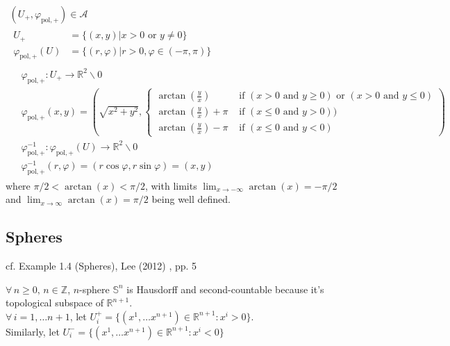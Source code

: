 \documentclass[10pt]{amsart}
\begin{document}
\begin{multicols*}{2}
\begin{equation} \label{Eq:UR22}
	\begin{gathered}
		(U_+, \varphi_{\text{pol},+}) \in \mathcal{A} \\ 
		\begin{aligned}
			U_+ & = \lbrace (x,y) | x>0 \text{ or } y \neq 0 \rbrace  \\
			\varphi_{\text{pol}, +}(U) & = \lbrace (r,\varphi) | r >0, \varphi \in (-\pi,\pi) \rbrace
		\end{aligned} \\
	 \begin{aligned}
			& \varphi_{\text{pol},+}:U_+ \to \mathbb{R}^2 \backslash 0 \\ 
			& \varphi_{\text{pol},+}(x,y) = ( \sqrt{x^2 + y^2}, \begin{cases} \arctan{ \left( \frac{y}{x} \right) }  & \text{ if } (x > 0 \text{ and } y \geq 0 ) \text{ or } (x > 0 \text{ and } y \leq 0) \\ \arctan{ \left( \frac{y}{x} \right) } + \pi & \text{ if } ( x \leq 0 \text{ and } y > 0)) \\
			\arctan{ \left( \frac{y}{x} \right) } - \pi & \text{ if } (x\leq 0 \text{ and } y < 0) \end{cases} ) \\ 
			& \varphi^{-1}_{\text{pol},+}: \varphi_{\text{pol},+}(U) \to \mathbb{R}^2\backslash 0 \\ 
			& \varphi^{-1}_{\text{pol},+}(r,\varphi) = (r\cos{\varphi}, r\sin{\varphi}) = (x,y)
		\end{aligned}
	\end{gathered}
\end{equation}
where $\pi/ 2 < \arctan(x) < \pi/ 2$, with limits $\lim_{x \to -\infty} \arctan(x) = -\pi/2$ and $\lim_{x \to \infty} \arctan(x) = \pi/2$ being well defined.



\subsection{Spheres}

cf. Example 1.4 (Spheres), Lee (2012) \cite{JLee2012}, pp. 5

$\forall \, n \geq 0, \, n \in \mathbb{Z}$, $n$-sphere $\mathbb{S}^n$ is Hausdorff and second-countable because it's topological subspace of $\mathbb{R}^{n+1}$. \\
$\forall \, i = 1, \dots n +1$, let $U_i^+ = \lbrace (x^1, \dots x^{n+1}) \in \mathbb{R}^{n+1}: x^i > 0 \rbrace$. \\
Similarly, let $U_i^- = \lbrace (x^1, \dots x^{n+1})  \in \mathbb{R}^{n+1} : x^i < 0 \rbrace$  \\


\end{multicols*}
\end{document}
